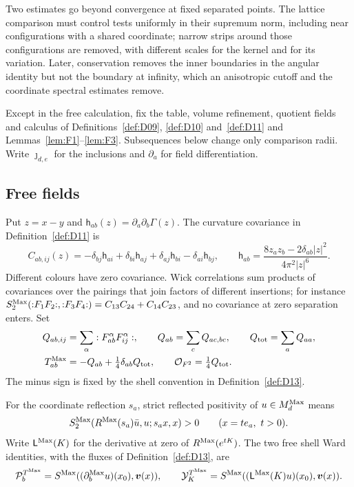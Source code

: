 Two estimates go beyond convergence at fixed separated points. The lattice comparison must control tests uniformly in their supremum norm, including near configurations with a shared coordinate; narrow strips around those configurations are removed, with different scales for the kernel and for its variation. Later, conservation removes the inner boundaries in the angular identity but not the boundary at infinity, which an anisotropic cutoff and the coordinate spectral estimates remove.

Except in the free calculation, fix the table, volume refinement, quotient fields and calculus of Definitions~\ref{def:D09}, \ref{def:D10} and~\ref{def:D11} and Lemmas~\ref{lem:F1}--\ref{lem:F3}. Subsequences below change only comparison radii. Write $\jmath_{d,e}$ for the inclusions and $\partial_a$ for field differentiation.

\subsection{Free fields}\label{sec:partII-G.1}

Put $z=x-y$ and $\mathsf h_{ab}(z)=\partial_a\partial_b\Gamma(z)$. The curvature covariance in Definition~\ref{def:D11} is
\begin{equation}\label{eq:G-curvature}
C_{ab,ij}(z)=-\delta_{bj}\mathsf h_{ai}+\delta_{bi}\mathsf h_{aj}
 +\delta_{aj}\mathsf h_{bi}-\delta_{ai}\mathsf h_{bj},\qquad
\mathsf h_{ab}=\frac{8z_az_b-2\delta_{ab}|z|^2}{4\pi^2|z|^6}.
\end{equation}
Different colours have zero covariance. Wick correlations sum products of covariances over the pairings that join factors of different insertions; for instance $S^{\mathrm{Max}}_2({:}F_1F_2{:},{:}F_3F_4{:})=C_{13}C_{24}+C_{14}C_{23}$, and no covariance at zero separation enters. Set
\begin{equation}\label{eq:G-free-tensor}
\begin{aligned}
Q_{ab,ij}&=\sum_\alpha:F_{ab}^\alpha F_{ij}^\alpha:,
\qquad Q_{ab}=\sum_cQ_{ac,bc},\qquad Q_{\rm tot}=\sum_aQ_{aa},\\
T^{\mathrm{Max}}_{ab}&=-Q_{ab}+\tfrac14\delta_{ab}Q_{\rm tot},
\qquad \mathcal{O}_{F^2}=\tfrac14Q_{\rm tot}.
\end{aligned}
\end{equation}
The minus sign is fixed by the shell convention in Definition~\ref{def:D13}.

For the coordinate reflection $s_a$, strict reflected positivity of $u\in M_{d}^{\mathrm{Max}}$ means
\begin{equation*}
S^{\mathrm{Max}}_2(R^{\rm Max}(s_a)\bar u,u;s_ax,x)>0
\qquad(x=te_a,\ t>0).
\end{equation*}
Write $\mathsf L^{\rm Max}(K)$ for the derivative at zero of $R^{\rm Max}(e^{tK})$. The two free shell Ward identities, with the fluxes of Definition~\ref{def:D13}, are
\begin{equation}\label{eq:G-free-shells}
\mathcal P_b^{T^{\rm Max}}=S^{\rm Max}((\partial_b^{\rm Max}u)(x_0),\boldsymbol v(x)),\qquad
\mathcal Y_K^{T^{\rm Max}}=S^{\rm Max}((\mathsf L^{\rm Max}(K)u)(x_0),\boldsymbol v(x)).
\end{equation}

